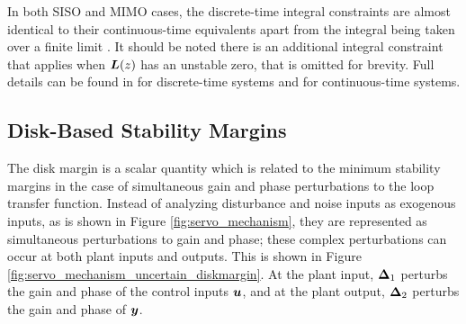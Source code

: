 In both SISO and MIMO cases, the discrete-time integral constraints are almost identical to their continuous-time equivalents apart from the integral being taken over a finite limit \cite{emami2019bode}.  It should be noted there is an additional integral constraint that applies when $\vb*{L}(z)$ has an unstable zero, that is omitted for brevity.  Full details can be found in \cite{emami2019bode,chen2000logarithmic} for discrete-time systems and \cite{stein2003respect, freudenberg1988frequency, skogestad2005multivariable, freudenberg1985right, boyd1991linear, chen1997logarithmic, chen1998logarithmic} for continuous-time systems.

\subsection{Disk-Based Stability Margins}
The disk margin \cite{seiler2020introduction} is a scalar quantity which is related to the minimum stability margins in the case of simultaneous gain and phase perturbations to the loop transfer function.  Instead of analyzing disturbance and noise inputs as exogenous inputs, as is shown in Figure \ref{fig:servo_mechanism}, they are represented as simultaneous perturbations to gain and phase; these complex perturbations can occur at both plant inputs and outputs.  This is shown in Figure \ref{fig:servo_mechanism_uncertain_diskmargin}.  At the plant input, $\vb*{\Delta}_{1}$ perturbs the gain and phase of the control inputs $\vb*{u}$, and at the plant output, $\vb*{\Delta}_{2}$ perturbs the gain and phase of $\vb*{y}$.


